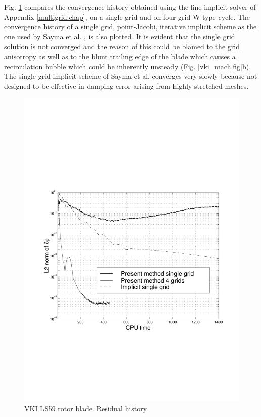  Fig. \ref{vki_res.fig} compares the convergence history obtained using the
 line-implicit solver of Appendix \ref{multigrid.chap}, on a single grid and
 on four grid W-type cycle. The convergence history
 of a single grid, point-Jacobi, iterative implicit scheme as the one
 used by Sayma et al. \citeyear{Luca:10}, is also plotted.
 It is evident that the single grid solution is not converged
 and the reason of this could be blamed to the grid anisotropy as well as
 to the blunt trailing edge of the blade which causes a recirculation bubble
 which could be inherently unsteady (Fig. \ref{vki_mach.fig}b).
 The single grid implicit scheme of Sayma et al. \citeyear{Luca:1} converges very slowly
 because not designed to be effective in damping error arising from highly stretched
 meshes.
%
\begin{figure}
 \centerline{\includegraphics[width=130mm,clip=t]{CHAP_NONLIN/FIGURE/vki_res.pdf}}
 \caption{VKI LS59 rotor blade. Residual history}
 \label{vki_res.fig}
\end{figure}
%
